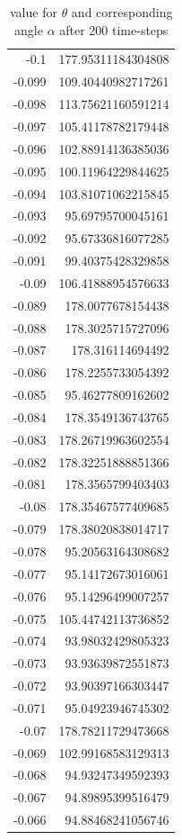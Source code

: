 \documentclass{mimosis}
\begin{document}
\begin{longtable}{rr}
\caption{\label{angle-table-square}value for \(\theta\) and corresponding angle \(\alpha\) after 200 time-steps}
\\
-0.1 & 177.95311184304808\\
-0.099 & 109.40440982717261\\
-0.098 & 113.75621160591214\\
-0.097 & 105.41178782179448\\
-0.096 & 102.88914136385036\\
-0.095 & 100.11964229844625\\
-0.094 & 103.81071062215845\\
-0.093 & 95.69795700045161\\
-0.092 & 95.67336816077285\\
-0.091 & 99.40375428329858\\
-0.09 & 106.41888954576633\\
-0.089 & 178.0077678154438\\
-0.088 & 178.3025715727096\\
-0.087 & 178.316114694492\\
-0.086 & 178.2255733054392\\
-0.085 & 95.46277809162602\\
-0.084 & 178.3549136743765\\
-0.083 & 178.26719963602554\\
-0.082 & 178.32251888851366\\
-0.081 & 178.3565799403403\\
-0.08 & 178.35467577409685\\
-0.079 & 178.38020838014717\\
-0.078 & 95.20563164308682\\
-0.077 & 95.14172673016061\\
-0.076 & 95.14296499007257\\
-0.075 & 105.44742113736852\\
-0.074 & 93.98032429805323\\
-0.073 & 93.93639872551873\\
-0.072 & 93.90397166303447\\
-0.071 & 95.04923946745302\\
-0.07 & 178.78211729473668\\
-0.069 & 102.99168583129313\\
-0.068 & 94.93247349592393\\
-0.067 & 94.89895399516479\\
-0.066 & 94.88468241056746\\

\end{longtable}
\end{document}
